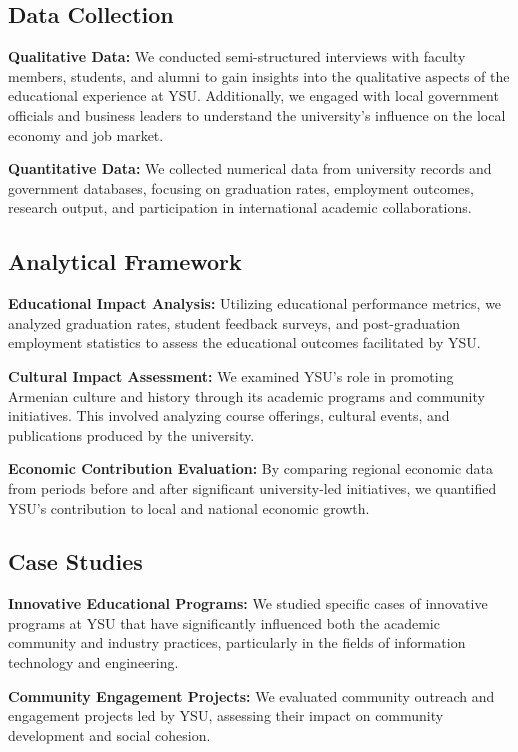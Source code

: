 \documentclass[12pt,onecolumn]{article}
\begin{document}
\subsection{Data Collection}

\textbf{Qualitative Data:} We conducted semi-structured interviews with faculty members, students, and alumni to gain insights into the qualitative aspects of the educational experience at YSU. Additionally, we engaged with local government officials and business leaders to understand the university's influence on the local economy and job market.

\textbf{Quantitative Data:} We collected numerical data from university records and government databases, focusing on graduation rates, employment outcomes, research output, and participation in international academic collaborations.

\subsection{Analytical Framework}

\textbf{Educational Impact Analysis:} Utilizing educational performance metrics, we analyzed graduation rates, student feedback surveys, and post-graduation employment statistics to assess the educational outcomes facilitated by YSU.

\textbf{Cultural Impact Assessment:} We examined YSU's role in promoting Armenian culture and history through its academic programs and community initiatives. This involved analyzing course offerings, cultural events, and publications produced by the university.

\textbf{Economic Contribution Evaluation:} By comparing regional economic data from periods before and after significant university-led initiatives, we quantified YSU's contribution to local and national economic growth.

\subsection{Case Studies}

\textbf{Innovative Educational Programs:} We studied specific cases of innovative programs at YSU that have significantly influenced both the academic community and industry practices, particularly in the fields of information technology and engineering.

\textbf{Community Engagement Projects:} We evaluated community outreach and engagement projects led by YSU, assessing their impact on community development and social cohesion.
\end{document}

